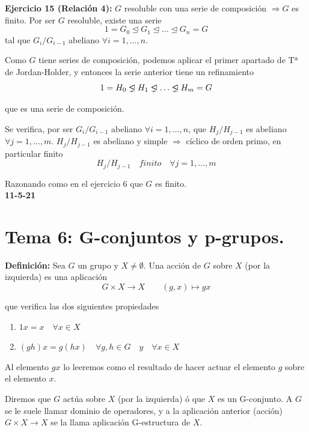 \documentclass{article}
\newcommand{\unlhdneq}{%
  \mathrel{\ooalign{$\lneq$\cr\raise.22ex\hbox{$\lhd$}\cr}}}
\begin{document}
\textbf{Ejercicio 15 (Relación 4):} $G$ resoluble con una serie de composición $\Rightarrow G$ es finito. Por ser $G$ resoluble, existe una serie
\begin{equation*}
1=G_0\unlhd G_1\unlhd \ldots\unlhd G_n=G
\end{equation*}
tal que $G_i/G_{i-1}$ abeliano $\forall i=1,\ldots,n$. 

Como $G$ tiene series de composición, podemos aplicar el primer apartado de Tª de Jordan-Holder, y entonces la serie anterior tiene un refinamiento
\begin{equation*}
1=H_0\unlhdneq H_1\unlhdneq \ldots\unlhdneq H_m=G
\end{equation*}

que es una serie de composición.

Se verifica, por ser $G_i/G_{i-1}$ abeliano $\forall i=1,\ldots,n$, que $H_j/H_{j-1}$ es abeliano $\forall j=1,\ldots,m$. $H_j/H_{j-1}$ es abeliano y simple $\Rightarrow$ cíclico de orden primo, en particular finito
\begin{equation*}
H_j/H_{j-1}\quad finito\quad \forall j=1,\ldots,m
\end{equation*}

Razonando como en el ejercicio 6 que $G$ es finito. \\

\textbf{11-5-21} 

\section{Tema 6: G-conjuntos y p-grupos.}
\textbf{Definición:} Sea $G$ un grupo y $X\neq\emptyset$. Una acción de $G$ sobre $X$ (por la izquierda) es una aplicación
\begin{equation*}
G\times X\longrightarrow X \qquad (g,x)\longmapsto gx
\end{equation*}

que verifica las dos siguientes propiedades
\begin{enumerate}[1)]
\item $1x=x\quad \forall x\in X$

\item $(gh)x=g(hx) \quad \forall g,h\in G \quad y\quad \forall x\in X$
\end{enumerate}

Al elemento $gx$ lo leeremos como el resultado de hacer actuar el elemento $g$ sobre el elemento $x$. 

Diremos que $G$ actúa sobre $X$ (por la izquierda) ó que $X$ es un G-conjunto. A $G$ se le suele llamar dominio de operadores, y a la aplicación anterior (acción) $G\times X\longrightarrow X$ se la llama aplicación G-estructura de $X$.
\end{document}
